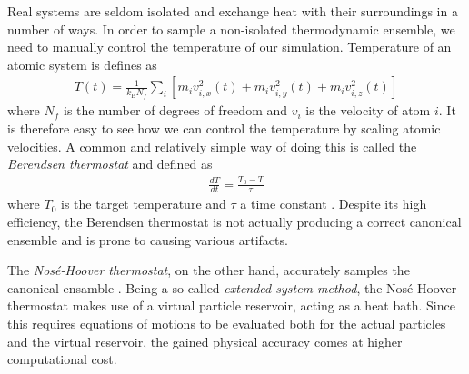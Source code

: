 Real systems are seldom isolated and exchange heat with their surroundings in a number of ways. 
In order to sample a non-isolated thermodynamic ensemble, we need to manually control the temperature of our simulation. 
Temperature of an atomic system is defines as
\begin{align}
T(t) = \frac{1}{k_{\text{B}}N_f}\sum_{i}\left[ m_iv_{i,x}^2(t) + m_iv_{i,y}^2(t) + m_iv_{i,z}^2(t)\right]
\end{align}
where $N_f$ is the number of degrees of freedom and $v_{i}$ is the velocity of atom $i$. 
It is therefore easy to see how we can control the temperature by scaling atomic velocities.
A common and relatively simple way of doing this is called the \textit{Berendsen thermostat} and defined as
\begin{align}
\frac{dT}{dt} = \frac{T_0-T}{\tau}
\end{align}
where $T_0$ is the target temperature and $\tau$ a time constant \cite{berendsen1984molecular}. 
Despite its high efficiency, the Berendsen thermostat is not actually producing a correct canonical ensemble and is prone to causing various artifacts.

The \textit{Nos\'{e}-Hoover thermostat}, on the other hand, accurately samples the canonical ensamble \cite{nose1984unified}. 
Being a so called \textit{extended system method}, the Nos\'{e}-Hoover thermostat makes use of a virtual particle reservoir, acting as a heat bath. 
Since this requires equations of motions to be evaluated both for the actual particles and the virtual reservoir, the gained physical accuracy comes at higher computational cost.

